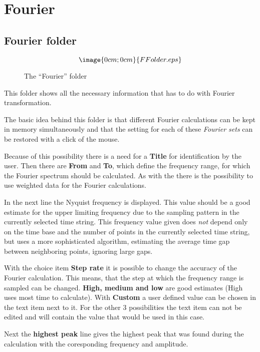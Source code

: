 \section{Fourier}%
\label{fourier.detailed}

\subsection{Fourier folder}%
\label{fourier.folder}

\begin{figure}[h]
$$\image{0cm;0cm}{FFolder.eps}$$
\caption{The ``Fourier'' folder}
\end{figure}

This folder shows all the necessary information that has to do with 
Fourier transformation.

The basic idea behind this folder is that different Fourier calculations 
can be kept in memory simultaneously and that the setting for each of these 
{\it Fourier sets} can be restored with a click of the mouse.

Because of this possibility there is a need for a {\bf Title} for 
identification by the user.
Then there are {\bf From} and {\bf To}, which define the frequency range,
for which the Fourier spectrum should be calculated.
As with the  there is the possibility
to use weighted data for the Fourier calculations.

 In the next line the Nyquist frequency
is displayed. This value should be a good
estimate for the upper limiting frequency due to the sampling pattern in
the currently selected time string.
This frequency value given does {\it not} depend only on the time base 
and the number of points in the currently selected time string, 
but uses a more sophisticated algorithm, estimating the average 
time gap between neighboring points, ignoring large gaps.

With the choice item {\bf Step rate} it is possible to change the accuracy 
of the Fourier calculation. This means, that the step at which the frequency 
range is sampled can be changed. {\bf High, medium and low} are good 
estimates (High uses most time to calculate).
With {\bf Custom} a user defined value can be chosen 
in the text item next to it.
For the other 3 possibilities the text item can not be edited and
will contain the value that would be used in this case.

Next the {\bf highest peak} line gives the highest peak that was 
found during the calculation with the coresponding frequency and amplitude.

